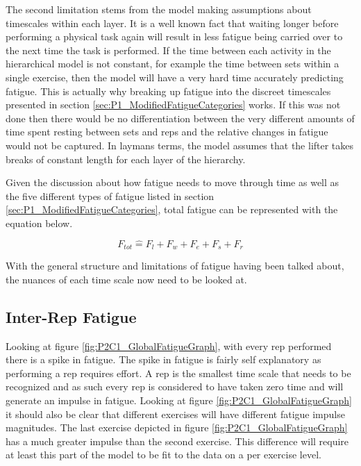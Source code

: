 The second limitation stems from the model making assumptions about timescales within each layer. It is a well known fact that waiting longer before performing a physical task again will result in less fatigue being carried over to the next time the task is performed. If the time between each activity in the hierarchical model is not constant, for example the time between sets within a single exercise, then the model will have a very hard time accurately predicting fatigue. This is actually why breaking up fatigue into the discreet timescales presented in section \ref{sec:P1_ModifiedFatigueCategories} works. If this was not done then there would be no differentiation between the very different amounts of time spent resting between sets and reps and the relative changes in fatigue would not be captured. In laymans terms, the model assumes that the lifter takes breaks of constant length for each layer of the hierarchy.

Given the discussion about how fatigue needs to move through time as well as the five different types of fatigue listed in section \ref{sec:P1_ModifiedFatigueCategories}, total fatigue can be represented with the equation below.

\begin{equation}
	\label{eq:P2C1_TotalFatigue}
	F_{tot} \hat{=} F_l+F_w+F_e+F_s+F_r
\end{equation}

With the general structure and limitations of fatigue having been talked about, the nuances of each time scale now need to be looked at.

\subsection{Inter-Rep Fatigue}
\label{sec:P2C1_InterRepFatigue}

Looking at figure \ref{fig:P2C1_GlobalFatigueGraph}, with every rep performed there is a spike in fatigue. The spike in fatigue is fairly self explanatory as performing a rep requires effort. A rep is the smallest time scale that needs to be recognized and as such every rep is considered to have taken zero time and will generate an impulse in fatigue. Looking at figure \ref{fig:P2C1_GlobalFatigueGraph} it should also be clear that different exercises will have different fatigue impulse magnitudes. The last exercise depicted in figure \ref{fig:P2C1_GlobalFatigueGraph} has a much greater impulse than the second exercise. This difference will require at least this part of the model to be fit to the data on a per exercise level. 

